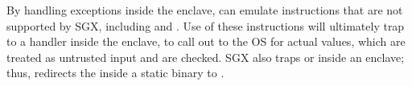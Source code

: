 By handling exceptions inside the enclave, \graphenesgx{} can emulate instructions that are not supported by SGX, including  and .
Use of these instructions will ultimately trap to a handler inside the enclave,
to call out to the OS for actual values, which are treated as untrusted input and are checked.
SGX also traps  or  inside an enclave;
thus, \graphenesgx{} redirects the \linuxapis{} inside a static binary
to \thelibos{}.



